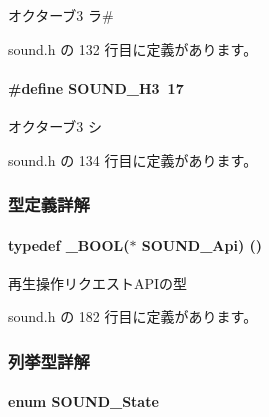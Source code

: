 オクターブ3 ラ\# 



 sound.\+h の 132 行目に定義があります。

\paragraph[{S\+O\+U\+N\+D\+\_\+\+H3}]{\setlength{\rightskip}{0pt plus 5cm}\#define S\+O\+U\+N\+D\+\_\+\+H3~17}\label{sound_8h_a931824d8aaced5b4db469aa58517d993_a931824d8aaced5b4db469aa58517d993}


オクターブ3 シ 



 sound.\+h の 134 行目に定義があります。



\subsubsection{型定義詳解}
\paragraph[{S\+O\+U\+N\+D\+\_\+\+Api}]{\setlength{\rightskip}{0pt plus 5cm}typedef {\bf \+\_\+\+B\+O\+O\+L}($\ast$ S\+O\+U\+N\+D\+\_\+\+Api) ()}\label{sound_8h_a25ea542ecfc47a97aed27c42ee791f3f_a25ea542ecfc47a97aed27c42ee791f3f}


再生操作リクエスト\+A\+P\+Iの型 



 sound.\+h の 182 行目に定義があります。



\subsubsection{列挙型詳解}
\paragraph[{S\+O\+U\+N\+D\+\_\+\+State}]{\setlength{\rightskip}{0pt plus 5cm}enum {\bf S\+O\+U\+N\+D\+\_\+\+State}}\label{sound_8h_abb21e5244ee60939e8a32ec932e9d7b3_abb21e5244ee60939e8a32ec932e9d7b3}



